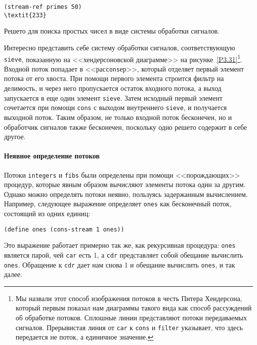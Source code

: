 \begin{Verbatim}[fontsize=\small]
(stream-ref primes 50)
\textit{233}
\end{Verbatim}


\begin{cntrfig}


\caption{Решето для поиска простых чисел в виде
системы обработки сигналов.}
\label{P3.31}

\end{cntrfig}

Интересно представить себе систему обработки сигналов,
соответствующую {\tt sieve}, показанную на
<<хендерсоновской
диаграмме>> на рисунке~\ref{P3.31}\footnote{Мы назвали этот способ изображения потоков в честь
Питера Хендерсона, который первым показал нам диаграммы такого вида
как способ рассуждений об обработке потоков.  Сплошные линии
представляют потоки передаваемых сигналов.  Прерывистая линия от
{\tt car} к {\tt cons} и {\tt filter} указывает,
что здесь передается не поток, а  единичное значение.}.
Входной поток попадает в <<рас{\tt cons}ер>>, который отделяет первый
элемент потока от его хвоста.  При помощи первого элемента строится
фильтр на делимость, и через него пропускается остаток входного
потока, а выход запускается в еще один элемент {\tt sieve}.
Затем исходный первый элемент сочетается при помощи {\tt cons}
с выходом внутреннего {\tt sieve}, и получается выходной
поток.  Таким образом, не только входной поток бесконечен, но и
обработчик сигналов также бесконечен, поскольку одно решето содержит в
себе другое.

\paragraph{Неявное определение потоков}

Потоки {\tt integers} и {\tt fibs} были
определены при помощи <<порождающих>> процедур, которые явным образом
вычисляют элементы потока один за другим.  Однако можно определять
потоки неявно, пользуясь задержанным вычислением.  Например, следующее
выражение определяет {\tt ones} как бесконечный поток,
состоящий из одних единиц:

\begin{Verbatim}[fontsize=\small]
(define ones (cons-stream 1 ones))
\end{Verbatim}
Это выражение работает примерно так же, как рекурсивная процедура:
{\tt ones} является парой, чей {\tt car} есть 1, а
{\tt cdr} представляет собой обещание вычислить
{\tt ones}. Обращение к {\tt cdr} дает нам снова 1 и
обещание вычислить {\tt ones}, и так далее.

